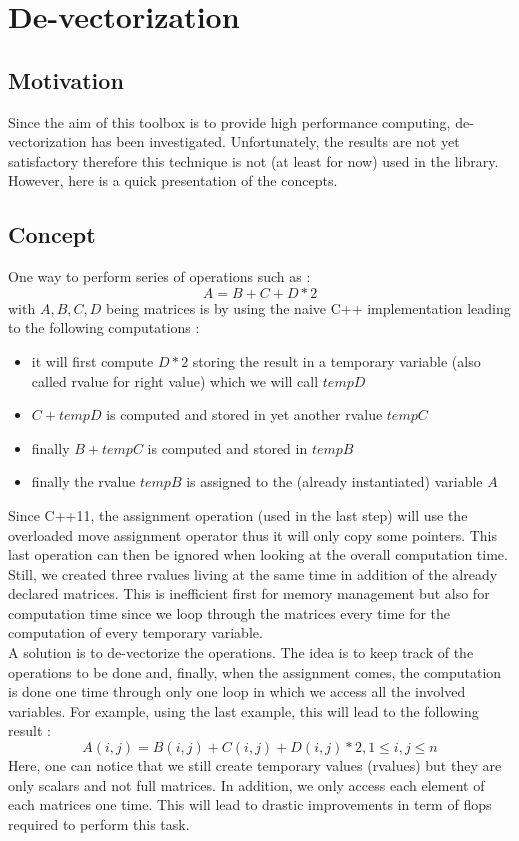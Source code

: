 \documentclass[a4paper]{report}
\begin{document}
\section{De-vectorization}
\subsection{Motivation}
Since the aim of this toolbox is to provide high performance computing, de-vectorization has been investigated. Unfortunately, the results are not yet satisfactory therefore this technique is not (at least for now) used in the library. However, here is a quick presentation of the concepts.
\subsection{Concept}
One way to perform series of operations such as :
\[
A=B+C+D*2
\]
with $A,B,C,D$ being matrices is by using the naive C++ implementation leading to the following computations :
\begin{itemize}
\item it will first compute $D*2$ storing the result in a temporary variable (also called rvalue for right value) which we will call $tempD$
\item $C+tempD$ is computed and stored in yet another rvalue $tempC$
\item finally $B+tempC$ is computed and stored in $tempB$
\item finally the rvalue $tempB$ is assigned to the (already instantiated) variable $A$
\end{itemize}
Since C++11, the assignment operation (used in the last step) will use the overloaded move assignment operator thus it will only copy some pointers. This last operation can then be ignored when looking at the overall computation time. Still, we created three rvalues living at the same time in addition of the already declared matrices. This is inefficient first for memory management but also for computation time since we loop through the matrices every time for the computation of every temporary variable.
\\
A solution is to de-vectorize the operations. The idea is to keep track of the operations to be done and, finally, when the assignment comes, the computation is done one time through only one loop in which we access all the involved variables. For example, using the last example, this will lead to the following result :
\[
A(i,j)=B(i,j)+C(i,j)+D(i,j)*2, 1 \leq i,j \leq n
\]
Here, one can notice that we still create temporary values (rvalues) but they are only scalars and not full matrices. In addition, we only access each element of each matrices one time. This will lead to drastic improvements in term of flops required to perform this task.
\end{document}
